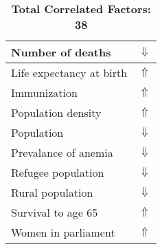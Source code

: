 \documentclass[12pt,notitlepage,oneside]{report}
\begin{document}
\begin{table}[!htb]
\begin{tabular}{|l|l|}
Number of deaths & $\Downarrow$\\ \hline
Life expectancy at birth & $\Uparrow$\\ \hline
Immunization & $\Uparrow$\\ \hline
Population density & $\Uparrow$\\ \hline
Population & $\Downarrow$\\ \hline
Prevalance of anemia & $\Downarrow$\\ \hline
Refugee population & $\Downarrow$\\ \hline
Rural population & $\Downarrow$\\ \hline
Survival to age 65 & $\Uparrow$\\ \hline
Women in parliament & $\Uparrow$\\ \hline
\end{tabular}
\caption*{\textbf{Total Correlated Factors: 38}}
\end{table}
\clearpage
\end{document}
